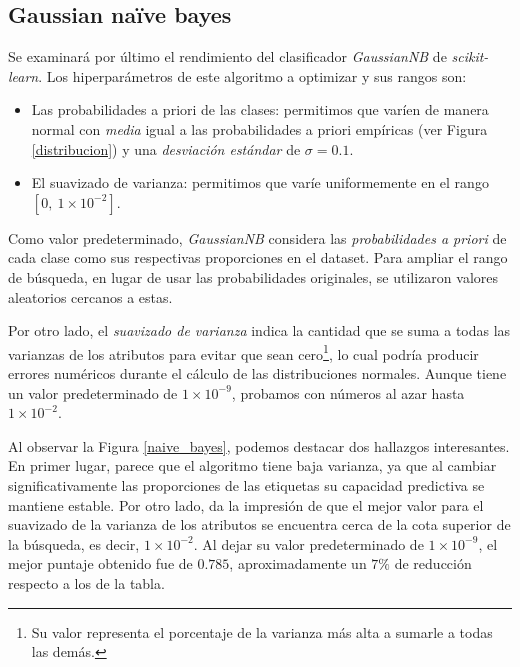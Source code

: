 \subsection{Gaussian naïve bayes}
Se examinará por último el rendimiento del clasificador \textit{GaussianNB} de \textit{scikit-learn}. Los hiperparámetros de este algoritmo a optimizar y sus rangos son:

\begin{itemize}
    \item Las probabilidades a priori de las clases: permitimos que varíen de manera normal con \textit{media} igual a las probabilidades a priori empíricas (ver Figura \ref{distribucion}) y una \textit{desviación estándar} de $\sigma = 0.1$.
    \item El suavizado de varianza: permitimos que varíe uniformemente en el rango $[0,\ 1 \times 10^{-2}]$.
\end{itemize}

Como valor predeterminado, \textit{GaussianNB} considera las \textit{probabilidades a priori} de cada clase como sus respectivas proporciones en el dataset. Para ampliar el rango de búsqueda, en lugar de usar las probabilidades originales, se utilizaron valores aleatorios cercanos a estas.

Por otro lado, el \textit{suavizado de varianza} indica la cantidad que se suma a todas las varianzas de los atributos para evitar que sean cero\footnote{Su valor representa el porcentaje de la varianza más alta a sumarle a todas las demás.}, lo cual podría producir errores numéricos durante el cálculo de las distribuciones normales. Aunque tiene un valor predeterminado de $1 \times 10^{-9}$, probamos con números al azar hasta $1 \times 10^{-2}$.

Al observar la Figura \ref{naive_bayes}, podemos destacar dos hallazgos interesantes. En primer lugar, parece que el algoritmo tiene baja varianza, ya que al cambiar significativamente las proporciones de las etiquetas su capacidad predictiva se mantiene estable. Por otro lado, da la impresión de que el mejor valor para el suavizado de la varianza de los atributos se encuentra cerca de la cota superior de la búsqueda, es decir, $1 \times 10^{-2}$. Al dejar su valor predeterminado de $1 \times 10^{-9}$, el mejor puntaje obtenido fue de $0.785$, aproximadamente un $7\%$ de reducción respecto a los de la tabla.


